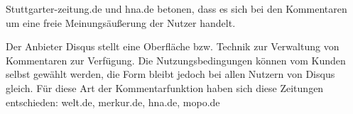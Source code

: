 Stuttgarter-zeitung.de und hna.de betonen, dass es sich bei den Kommentaren um eine freie 
Meinungsäußerung der Nutzer handelt. 

Der Anbieter Disqus stellt eine Oberfläche bzw. Technik zur Verwaltung von Kommentaren zur Verfügung. 
Die Nutzungsbedingungen können vom Kunden selbst gewählt werden, die Form bleibt jedoch 
bei allen Nutzern von Disqus gleich. Für diese Art der Kommentarfunktion haben sich diese
Zeitungen entschieden: welt.de, merkur.de, hna.de, mopo.de













